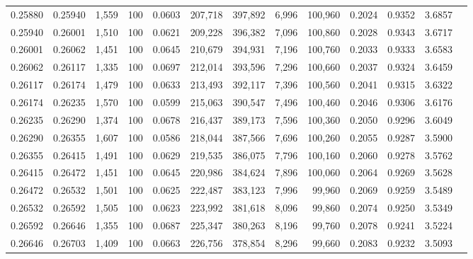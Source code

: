 \begin{tabular}{rrrrrrrrrrrrr}
0.25880 & 0.25940 &  1,559 & 100 &                                     0.0603 & 207,718 & 397,892 &   6,996 & 100,960 & 0.2024 & 0.9352 & 3.6857 \\
0.25940 & 0.26001 &  1,510 & 100 &                                     0.0621 & 209,228 & 396,382 &   7,096 & 100,860 & 0.2028 & 0.9343 & 3.6717 \\
0.26001 & 0.26062 &  1,451 & 100 &                                     0.0645 & 210,679 & 394,931 &   7,196 & 100,760 & 0.2033 & 0.9333 & 3.6583 \\
0.26062 & 0.26117 &  1,335 & 100 &                                     0.0697 & 212,014 & 393,596 &   7,296 & 100,660 & 0.2037 & 0.9324 & 3.6459 \\
0.26117 & 0.26174 &  1,479 & 100 &                                     0.0633 & 213,493 & 392,117 &   7,396 & 100,560 & 0.2041 & 0.9315 & 3.6322 \\
0.26174 & 0.26235 &  1,570 & 100 &                                     0.0599 & 215,063 & 390,547 &   7,496 & 100,460 & 0.2046 & 0.9306 & 3.6176 \\
0.26235 & 0.26290 &  1,374 & 100 &                                     0.0678 & 216,437 & 389,173 &   7,596 & 100,360 & 0.2050 & 0.9296 & 3.6049 \\
0.26290 & 0.26355 &  1,607 & 100 &                                     0.0586 & 218,044 & 387,566 &   7,696 & 100,260 & 0.2055 & 0.9287 & 3.5900 \\
0.26355 & 0.26415 &  1,491 & 100 &                                     0.0629 & 219,535 & 386,075 &   7,796 & 100,160 & 0.2060 & 0.9278 & 3.5762 \\
0.26415 & 0.26472 &  1,451 & 100 &                                     0.0645 & 220,986 & 384,624 &   7,896 & 100,060 & 0.2064 & 0.9269 & 3.5628 \\
0.26472 & 0.26532 &  1,501 & 100 &                                     0.0625 & 222,487 & 383,123 &   7,996 &  99,960 & 0.2069 & 0.9259 & 3.5489 \\
0.26532 & 0.26592 &  1,505 & 100 &                                     0.0623 & 223,992 & 381,618 &   8,096 &  99,860 & 0.2074 & 0.9250 & 3.5349 \\
0.26592 & 0.26646 &  1,355 & 100 &                                     0.0687 & 225,347 & 380,263 &   8,196 &  99,760 & 0.2078 & 0.9241 & 3.5224 \\
0.26646 & 0.26703 &  1,409 & 100 &                                     0.0663 & 226,756 & 378,854 &   8,296 &  99,660 & 0.2083 & 0.9232 & 3.5093 \\

\end{tabular}
